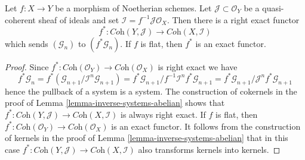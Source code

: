 \begin{lemma}
\label{lemma-inverse-systems-pullback}
Let $f : X \to Y$ be a morphism of Noetherian schemes.
Let $\mathcal{J} \subset \mathcal{O}_Y$ be a quasi-coherent sheaf
of ideals and set $\mathcal{I} = f^{-1}\mathcal{J} \mathcal{O}_X$.
Then there is a right exact functor
$$
f^* : \textit{Coh}(Y, \mathcal{J}) \longrightarrow \textit{Coh}(X, \mathcal{I})
$$
which sends $(\mathcal{G}_n)$ to $(f^*\mathcal{G}_n)$. If $f$ is flat,
then $f^*$ is an exact functor.
\end{lemma}

\begin{proof}
Since $f^* : \textit{Coh}(\mathcal{O}_Y) \to \textit{Coh}(\mathcal{O}_X)$
is right exact we have
$$
f^*\mathcal{G}_n =
f^*(\mathcal{G}_{n + 1}/\mathcal{I}^n\mathcal{G}_{n + 1}) =
f^*\mathcal{G}_{n + 1}/f^{-1}\mathcal{I}^nf^*\mathcal{G}_{n + 1} =
f^*\mathcal{G}_{n + 1}/\mathcal{J}^nf^*\mathcal{G}_{n + 1}
$$
hence the pullback of a system is a system. The construction of
cokernels in the proof of Lemma \ref{lemma-inverse-systems-abelian}
shows that
$f^* : \textit{Coh}(Y, \mathcal{J}) \to \textit{Coh}(X, \mathcal{I})$
is always right exact. If $f$ is flat, then
$f^* : \textit{Coh}(\mathcal{O}_Y) \to \textit{Coh}(\mathcal{O}_X)$
is an exact functor. It follows from the construction of kernels
in the proof of Lemma \ref{lemma-inverse-systems-abelian}
that in this case
$f^* : \textit{Coh}(Y, \mathcal{J}) \to \textit{Coh}(X, \mathcal{I})$
also transforms kernels into kernels.
\end{proof}

